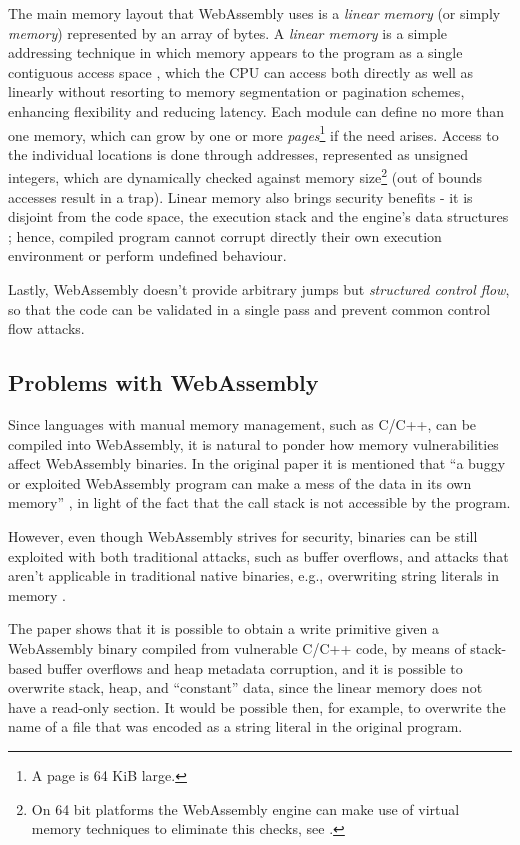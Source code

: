 The main memory layout that WebAssembly uses is a \textit{linear memory} (or simply \textit{memory}) represented
by an array of bytes. A \textit{linear memory} is a simple addressing technique in which memory appears to the
program as a single contiguous access space \cite{processor-microarchitecture}, which the CPU can access both directly as well as linearly
without resorting to memory segmentation or pagination schemes, enhancing flexibility and reducing latency.
Each module can define no more than one memory, which can grow by one or more
\textit{pages}\footnote{A page is 64 KiB large.} if the need arises.
Access to the individual locations is done through addresses, represented as unsigned integers,
which are dynamically checked against memory size\footnote{On 64 bit platforms the WebAssembly engine
can make use of virtual memory techniques to eliminate this checks, see \cite{bringing-the-web-up-to-speed-2017}.}
(out of bounds accesses result in a trap).
Linear memory also brings security benefits - it is disjoint from the code space, the execution stack and the engine's
data structures \cite{bringing-the-web-up-to-speed-2017}; hence, compiled program cannot corrupt directly their own execution
environment or perform undefined behaviour.

Lastly, WebAssembly doesn't provide arbitrary jumps but \textit{structured control flow},
so that the code can be validated in a single pass and prevent common control flow attacks.

\subsection{Problems with WebAssembly}

Since languages with manual memory management, such as C/C++, can be compiled into WebAssembly,
it is natural to ponder how memory vulnerabilities affect WebAssembly binaries.
In the original paper it is mentioned that ``a buggy or exploited WebAssembly program can make a mess of the data in its own memory''
\cite{bringing-the-web-up-to-speed-2017}, in light of the fact that the call stack is not accessible by the program.

However, even though WebAssembly strives for security, binaries can be still exploited with both traditional attacks,
such as buffer overflows, and attacks that aren't applicable in traditional native binaries, e.g., overwriting
string literals in memory \cite{binary-security-wasm-2020}.

The paper shows that it is possible to obtain a write primitive given a WebAssembly binary compiled from vulnerable C/C++ code,
by means of stack-based buffer overflows and heap metadata corruption, and it is possible to overwrite stack, heap, and ``constant''
data, since the linear memory does not have a read-only section. It would be possible then, for example, to overwrite the name
of a file that was encoded as a string literal in the original program.

